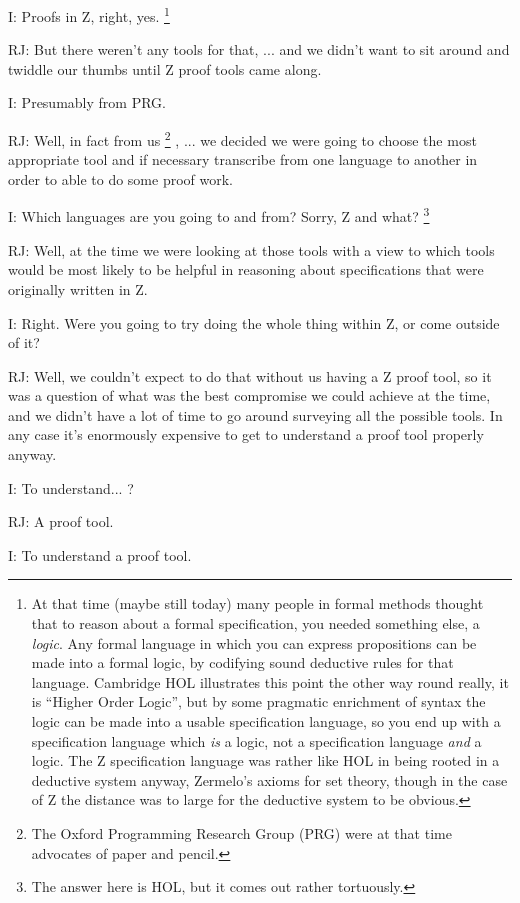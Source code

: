\documentclass[10pt,titlepage]{book}
\begin{document}
I: Proofs in Z, right, yes.
\footnote{
At that time (maybe still today) many people in formal methods thought that to reason about a formal specification, you needed something else, a {\it logic}.
Any formal language in which you can express propositions can be made into a formal logic, by codifying sound deductive rules for that language.
Cambridge HOL illustrates this point the other way round really, it is ``Higher Order Logic'', but by some pragmatic enrichment of syntax the logic can be made into a usable specification language, so you end up with a specification language which {\it is} a logic, not a specification language {\it and} a logic.
The Z specification language was rather like HOL in being rooted in a deductive system anyway, Zermelo's axioms for set theory, though in the case of Z the distance was to large for the deductive system to be obvious.
}

RJ: But there weren't any tools for that, ... and we didn't want to sit around and twiddle our thumbs until Z proof tools came along.

I: Presumably from PRG.

RJ: Well, in fact from us%
\footnote{The Oxford Programming Research Group (PRG) were at that time advocates of paper and pencil.}%
, ... we decided we were going to choose the most appropriate tool and if necessary transcribe from one language to another in order to able to do some proof work.

I: Which languages are you going to and from? Sorry, Z and what?%
\footnote{The answer here is HOL, but it comes out rather tortuously.}%

RJ: Well, at the time we were looking at those tools with a view to which tools would be most likely to be helpful in reasoning about specifications that were originally written in Z.

I: Right. Were you going to try doing the whole thing within Z, or come outside of it?

RJ: Well, we couldn't expect to do that without us having a Z proof tool, so it was a question of what was the best compromise we could achieve at the time, and we didn't have a lot of time to go around surveying all the possible tools.
In any case it's enormously expensive to get to understand a proof tool properly anyway.

I: To understand... ?

RJ: A proof tool.

I: To understand a proof tool.
\end{document}
